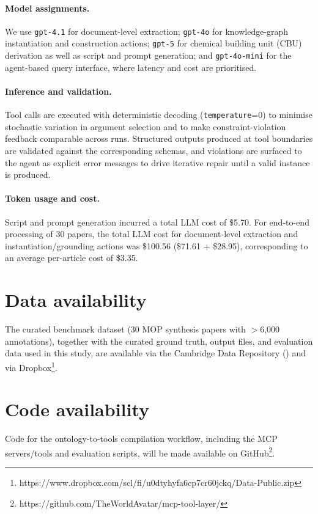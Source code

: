 \paragraph{Model assignments.}
We use \texttt{gpt-4.1} for document-level extraction; \texttt{gpt-4o} for knowledge-graph instantiation and construction actions; \texttt{gpt-5} for chemical building unit (CBU) derivation as well as script and prompt generation; and \texttt{gpt-4o-mini} for the agent-based query interface, where latency and cost are prioritised.

\paragraph{Inference and validation.}
Tool calls are executed with deterministic decoding (\texttt{temperature}=0) to minimise stochastic variation in argument selection and to make constraint-violation feedback comparable across runs. Structured outputs produced at tool boundaries are validated against the corresponding schemas, and violations are surfaced to the agent as explicit error messages to drive iterative repair until a valid instance is produced.

\paragraph{Token usage and cost.}
Script and prompt generation incurred a total LLM cost of \$5.70. For end-to-end processing of 30 papers, the total LLM cost for document-level extraction and instantiation/grounding actions was \$100.56 (\$71.61 + \$28.95), corresponding to an average per-article cost of \$3.35.



\section*{Data availability}
The curated benchmark dataset (30 MOP synthesis papers with $>$6{,}000 annotations), together with the curated ground truth, output files, and evaluation data used in this study, are available via the Cambridge Data Repository () and via Dropbox\footnote{https://www.dropbox.com/scl/fi/u0dtyhyfa6cp7cr60jckq/Data-Public.zip}.

\section*{Code availability}
Code for the ontology-to-tools compilation workflow, including the MCP servers/tools and evaluation scripts, will be made available on GitHub\footnote{https://github.com/TheWorldAvatar/mcp-tool-layer/}.


